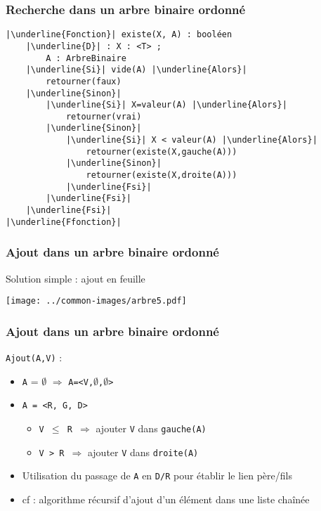 \documentclass[table,handout,tikz,12pt,svgnames]{beamer}
\begin{document}
\begin{frame}[fragile=singleslide]
	\frametitle{Recherche dans un arbre binaire ordonné}
	\vspace{-0.1cm}
	\begin{verbatim}
|\underline{Fonction}| existe(X, A) : booléen
	|\underline{D}| : X : <T> ; 
		A : ArbreBinaire
	|\underline{Si}| vide(A) |\underline{Alors}|
		retourner(faux)
	|\underline{Sinon}|
		|\underline{Si}| X=valeur(A) |\underline{Alors}|
			retourner(vrai)
		|\underline{Sinon}|
			|\underline{Si}| X < valeur(A) |\underline{Alors}| 
				retourner(existe(X,gauche(A)))
			|\underline{Sinon}|
				retourner(existe(X,droite(A)))
			|\underline{Fsi}|
		|\underline{Fsi}|
	|\underline{Fsi}|		
|\underline{Ffonction}|
		\end{verbatim}
\end{frame}


\begin{frame}[fragile=singleslide]
	\frametitle{Ajout dans un arbre binaire ordonné}
	\vspace{0.5cm}
	\begin{block}{Solution simple : ajout en feuille}
	\end{block}
	\begin{block}{}
		\vspace{-1.2cm}
		\begin{center}
			{\texttt{[image: ../common-images/arbre5.pdf]}}
		\end{center}
	\end{block}
\end{frame}


\begin{frame}[fragile=singleslide]
	\frametitle{Ajout dans un arbre binaire ordonné}
	\begin{block}{\texttt{Ajout(A,V)} :}
		\begin{itemize}
			\item \texttt{A} = $\emptyset$ $\Rightarrow$ \texttt{A=<V,$\emptyset$,$\emptyset$>}
			\item \texttt{A = <R, G, D>}
			\begin{itemize}
				\item \texttt{V $\leq$ R $\Rightarrow$} ajouter \texttt{V} dans \texttt{gauche(A)}
				\item \texttt{V > R $\Rightarrow$} ajouter \texttt{V} dans \texttt{droite(A)}
			\end{itemize}
			\item Utilisation du passage de \texttt{A} en \texttt{D/R} pour établir le lien père/fils
			\item cf : algorithme récursif d'ajout d'un élément dans une liste chaînée			
		\end{itemize}
	\end{block}
\end{frame}
\end{document}
